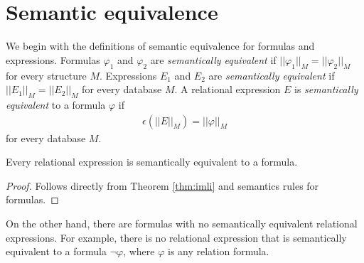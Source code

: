 \documentclass{lmcs}
\begin{document}
\section{Semantic equivalence}\label{sec:sem_eq}
We begin with the definitions of semantic equivalence for formulas and expressions.
Formulas $\varphi_1$ and $\varphi_2$ are \emph{semantically equivalent} if $||\varphi_1||_M=||\varphi_2||_M$ for every structure $M$. Expressions $E_1$ and $E_2$ are \emph{semantically equivalent} if $||E_1||_M=||E_2||_M$ for every database $M$. A relational expression $E$ is \emph{semantically equivalent} to a formula $\varphi$ if
\begin{align}
\epsilon(||E||_M)=||\varphi||_M 
\end{align}
for every database $M$.
\begin{thm}
Every relational expression  is semantically equivalent to a formula.  
\end{thm}
\begin{proof}
Follows directly from Theorem \ref{thm:imli} and semantics rules for formulas.
\end{proof}
On the other hand, there are formulas with no semantically equivalent relational expressions. For example, there is no relational expression that is semantically equivalent to a formula $\neg\varphi$, where $\varphi$ is any relation formula.
\end{document}
